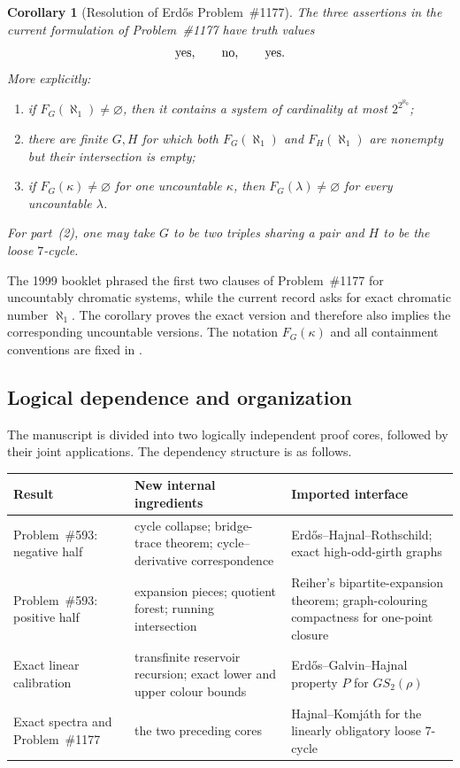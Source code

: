 \documentclass[11pt]{amsart}
\newtheorem{corollary}[corollary]{Corollary}
\theoremstyle{definition}
\theoremstyle{remark}
\numberwithin{equation}{section}
\begin{document}
\begin{corollary}[Resolution of Erd\H{o}s Problem~\#1177]
\label{cor:intro-1177}
The three assertions in the current formulation of Problem~\#1177 have truth
values
\[
  \textnormal{yes},\qquad \textnormal{no},\qquad \textnormal{yes}.
\]
More explicitly:
\begin{enumerate}[label=\textup{(\arabic*)}]
\item if $F_G(\aleph_1)\ne\varnothing$, then it contains a system of
cardinality at most $2^{2^{\aleph_0}}$;
\item there are finite $G,H$ for which both $F_G(\aleph_1)$ and
$F_H(\aleph_1)$ are nonempty but their intersection is empty;
\item if $F_G(\kappa)\ne\varnothing$ for one uncountable $\kappa$, then
$F_G(\lambda)\ne\varnothing$ for every uncountable $\lambda$.
\end{enumerate}
For part~\textup{(2)}, one may take $G$ to be two triples sharing a pair
and $H$ to be the loose $7$-cycle.
\end{corollary}

The 1999 booklet phrased the first two clauses of Problem~\#1177 for
uncountably chromatic systems, while the current record asks for exact chromatic
number $\aleph_1$.  The corollary proves the exact version and therefore also
implies the corresponding uncountable versions.  The notation $F_G(\kappa)$ and
all containment conventions are fixed in .

\subsection{Logical dependence and organization}

The manuscript is divided into two logically independent proof cores,
followed by their joint applications.  The dependency structure is as
follows.

\begin{center}
\small
\begin{tabular}{@{}>{\raggedright\arraybackslash}p{}>{\raggedright\arraybackslash}p{}>{\raggedright\arraybackslash}p{}@{}}
\toprule
Result & New internal ingredients & Imported interface \\
\midrule
Problem~\#593: negative half & cycle collapse; bridge-trace theorem;
cycle--derivative correspondence & Erd\H{o}s--Hajnal--Rothschild;
exact high-odd-girth graphs \\
Problem~\#593: positive half & expansion pieces; quotient forest;
running intersection & Reiher's bipartite-expansion theorem;
graph-colouring compactness for one-point closure \\
Exact linear calibration & transfinite reservoir recursion; exact lower
and upper colour bounds & Erd\H{o}s--Galvin--Hajnal property $P$ for
$GS_2(\rho)$ \\
Exact spectra and Problem~\#1177 & the two preceding cores &
Hajnal--Komj\'ath for the linearly obligatory loose $7$-cycle \\
\bottomrule
\end{tabular}
\end{center}
\end{document}
